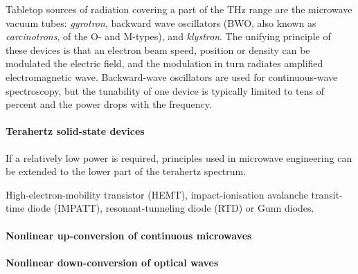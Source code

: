 Tabletop sources of radiation covering a part of the THz range are the microwave vacuum tubes: \textit{gyrotron}, backward wave oscillators (BWO, also known as \textit{carcinotrons}, of the O- and M-types), and \textit{klystron}. The unifying principle of these devices is that an electron beam speed, position or density can be modulated the electric field, and the modulation in turn radiates amplified electromagnetic wave. Backward-wave oscillators are used for continuous-wave spectroscopy, but the tunability of one device is typically limited to tens of percent and the power drops with the frequency.

\paragraph{Terahertz solid-state devices}
If a relatively low power is required, principles used in microwave engineering can be extended to the lower part of the terahertz spectrum. 

High-electron-mobility transistor (HEMT), impact-ionisation avalanche transit-time diode (IMPATT), resonant-tunneling diode (RTD)
\cite{brown1991oscillations}
 or Gunn diodes.



\paragraph{Nonlinear up-conversion of continuous microwaves}

\paragraph{Nonlinear down-conversion of optical waves}

